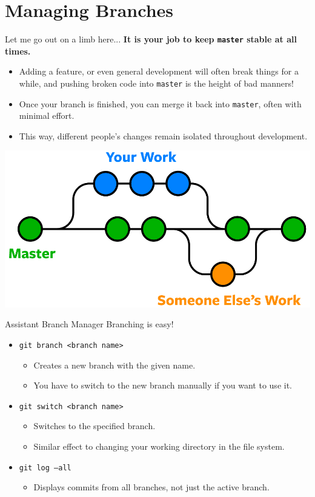 \documentclass[11pt]{beamer}
\begin{document}
\section[Branches]{Managing Branches}
\begin{frame}{Let me go out on a limb here...}
\textbf{It is your job to keep \texttt{master} stable at all times.} 
\begin{itemize}
\item Adding a feature, or even general development will often break things for a while, and pushing broken code into \texttt{master} is the height of bad manners! 
\item Once your branch is finished, you can merge it back into \texttt{master}, often with minimal effort.
\item This way, different people's changes remain isolated throughout development. 
\end{itemize}
\center
\includegraphics[scale=0.15]{git-branches-merge.png}
\end{frame}

\begin{frame}{Assistant Branch Manager}
Branching is easy!
\begin{itemize}
\item \texttt{git branch <branch name>}
\begin{itemize}
\item Creates a new branch with the given name.
\item You have to switch to the new branch manually if you want to use it.
\end{itemize}
\item \texttt{git switch <branch name>}
\begin{itemize}
\item Switches to the specified branch.  
\item Similar effect to changing your working directory in the file system.  
\end{itemize}
\item \texttt{git log --all} 
\begin{itemize}
\item Displays commits from all branches, not just the active branch.
\end{itemize}
\end{itemize}
\end{frame}
\end{document}
